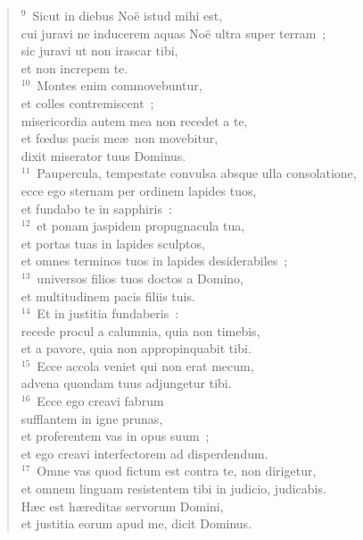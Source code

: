 \begin{flushleft}
\begin{verse}
${}^{9}$~Sicut in diebus No\"e istud mihi est,\\ cui juravi ne inducerem aquas No\"e ultra super terram~;\\ sic juravi ut non irascar tibi,\\ et non increpem te.\\
${}^{10}$~Montes enim commovebuntur,\\ et colles contremiscent~;\\ misericordia autem mea non recedet a te,\\ et fœdus pacis me\ae\ non movebitur,\\ dixit miserator tuus Dominus.\\
${}^{11}$~Paupercula, tempestate convulsa absque ulla consolatione,\\ ecce ego sternam per ordinem lapides tuos,\\ et fundabo te in sapphiris~:\\
${}^{12}$~et ponam jaspidem propugnacula tua,\\ et portas tuas in lapides sculptos,\\ et omnes terminos tuos in lapides desiderabiles~;\\
${}^{13}$~universos filios tuos doctos a Domino,\\ et multitudinem pacis filiis tuis.\\
${}^{14}$~Et in justitia fundaberis~:\\ recede procul a calumnia, quia non timebis,\\ et a pavore, quia non appropinquabit tibi.\\
${}^{15}$~Ecce accola veniet qui non erat mecum,\\ advena quondam tuus adjungetur tibi.\\
${}^{16}$~Ecce ego creavi fabrum\\ sufflantem in igne prunas,\\ et proferentem vas in opus suum~;\\ et ego creavi interfectorem ad disperdendum.\\
${}^{17}$~Omne vas quod fictum est contra te, non dirigetur,\\ et omnem linguam resistentem tibi in judicio, judicabis.\\ H\ae c est h\ae reditas servorum Domini,\\ et justitia eorum apud me, dicit Dominus.\end{verse}\end{flushleft}


